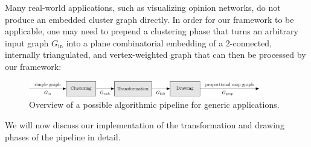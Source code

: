 Many real-world applications, such as visualizing opinion networks, do not produce an embedded cluster graph directly. In order for our framework to be applicable, one may need to prepend a clustering phase that turns an arbitrary input graph $G_\text{in}$ into a plane combinatorial embedding of a 2-connected, internally triangulated, and vertex-weighted graph that can then be processed by our framework:
%
\begin{figure}[H]
	\centering\includegraphics[width=0.9\textwidth]{Resources/StaticPipeline-Augmented.pdf}
	\caption{Overview of a possible algorithmic pipeline for generic applications.}
	\label{fig:static-pipeline-augmented}
\end{figure}

We will now discuss our implementation of the transformation and drawing phases of the pipeline in detail.

\clearpage


\clearpage

